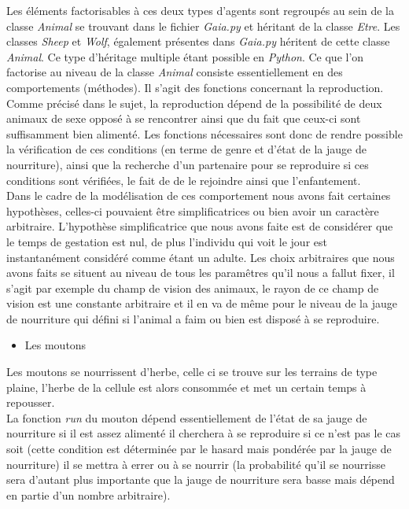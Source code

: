 \documentclass[12pt]{article}
\begin{document}
Les éléments factorisables à ces deux types d'agents sont 
regroupés au sein de la classe \textit{Animal} se trouvant dans le fichier 
\textit{Gaia.py} et héritant de la classe \textit{Etre}. Les classes 
\textit{Sheep} et \textit{Wolf}, également présentes dans \textit{Gaia.py}
héritent de cette classe \textit{Animal}. Ce type d'héritage multiple étant 
possible en \textit{Python}. Ce que l'on factorise au niveau de la classe 
\textit{Animal} consiste essentiellement en des comportements (méthodes). Il 
s'agit des fonctions concernant la reproduction.\\

Comme précisé dans le sujet, la reproduction dépend de la possibilité de deux 
animaux de sexe opposé à se rencontrer ainsi que du fait que ceux-ci sont 
suffisamment bien alimenté. Les fonctions nécessaires sont donc de rendre 
possible la vérification de ces conditions (en terme de genre et d'état de la 
jauge de nourriture), ainsi que la recherche d'un partenaire pour se 
reproduire si ces conditions sont vérifiées, le fait de de le rejoindre ainsi 
que l'enfantement.\\

Dans le cadre de la modélisation de ces comportement nous avons fait certaines 
hypothèses, celles-ci pouvaient être simplificatrices ou bien avoir un 
caractère arbitraire. L'hypothèse simplificatrice que nous avons faite est de 
considérer que le temps de gestation est nul, de plus l'individu qui voit le 
jour est instantanément considéré comme étant un adulte. Les choix arbitraires 
que nous avons faits se situent au niveau de tous les paramêtres qu'il nous a 
fallut fixer, il s'agit par exemple du champ de vision des animaux, le rayon 
de ce champ de vision est une constante arbitraire et il en va de même pour 
le niveau de la jauge de nourriture qui défini si l'animal a faim ou bien est 
disposé à se reproduire.\\

		\begin{itemize}
		\item Les moutons\\
		\end{itemize}

Les moutons se nourrissent d'herbe, celle ci se trouve sur les terrains de type 
plaine, l'herbe de la cellule est alors consommée et met un certain temps à 
repousser.\\

La fonction \textit{run} du mouton dépend essentiellement de l'état de sa 
jauge de nourriture si il est assez alimenté il cherchera à se reproduire 
si ce n'est pas le cas soit (cette condition est déterminée par le hasard mais 
pondérée par la jauge de nourriture) il se mettra à errer ou à se nourrir (la 
probabilité qu'il se nourrisse sera d'autant plus importante que la jauge de 
nourriture sera basse mais dépend en partie d'un nombre arbitraire).\\
\end{document}
